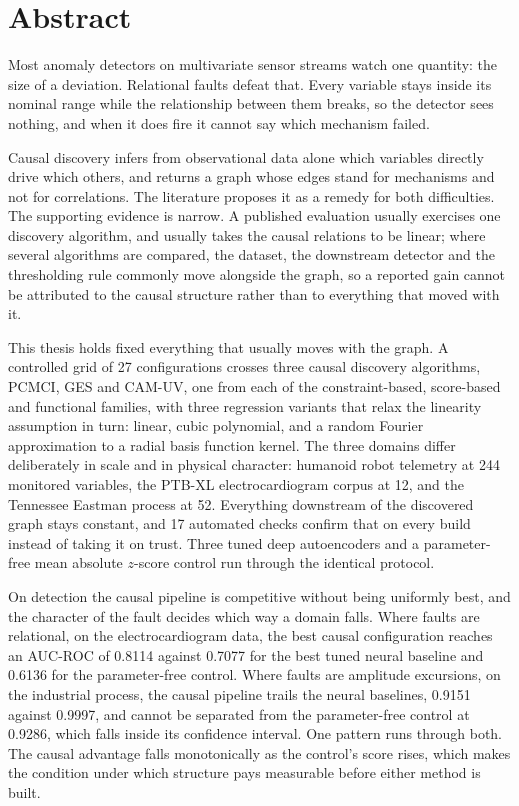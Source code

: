 \chapter*{Abstract}

Most anomaly detectors on multivariate sensor streams watch one quantity: the size of a deviation. Relational faults defeat that. Every variable stays inside its nominal range while the relationship between them breaks, so the detector sees nothing, and when it does fire it cannot say which mechanism failed.

Causal discovery infers from observational data alone which variables directly drive which others, and returns a graph whose edges stand for mechanisms and not for correlations. The literature proposes it as a remedy for both difficulties. The supporting evidence is narrow. A published evaluation usually exercises one discovery algorithm, and usually takes the causal relations to be linear; where several algorithms are compared, the dataset, the downstream detector and the thresholding rule commonly move alongside the graph, so a reported gain cannot be attributed to the causal structure rather than to everything that moved with it.

This thesis holds fixed everything that usually moves with the graph. A controlled grid of 27 configurations crosses three causal discovery algorithms, PCMCI, GES and CAM-UV, one from each of the constraint-based, score-based and functional families, with three regression variants that relax the linearity assumption in turn: linear, cubic polynomial, and a random Fourier approximation to a radial basis function kernel. The three domains differ deliberately in scale and in physical character: humanoid robot telemetry at 244 monitored variables, the PTB-XL electrocardiogram corpus at 12, and the Tennessee Eastman process at 52. Everything downstream of the discovered graph stays constant, and 17 automated checks confirm that on every build instead of taking it on trust. Three tuned deep autoencoders and a parameter-free mean absolute $z$-score control run through the identical protocol.

On detection the causal pipeline is competitive without being uniformly best, and the character of the fault decides which way a domain falls. Where faults are relational, on the electrocardiogram data, the best causal configuration reaches an AUC-ROC of 0.8114 against 0.7077 for the best tuned neural baseline and 0.6136 for the parameter-free control. Where faults are amplitude excursions, on the industrial process, the causal pipeline trails the neural baselines, 0.9151 against 0.9997, and cannot be separated from the parameter-free control at 0.9286, which falls inside its confidence interval. One pattern runs through both. The causal advantage falls monotonically as the control's score rises, which makes the condition under which structure pays measurable before either method is built.

